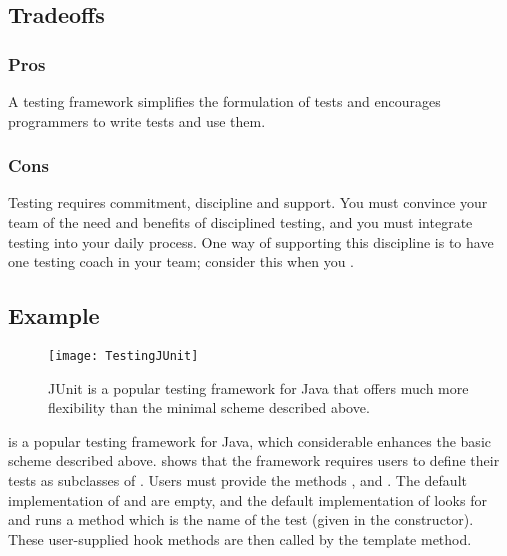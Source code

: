 \documentclass[a4paper,10pt,twoside]{book}
\begin{document}
\subsection*{Tradeoffs}

\subsubsection*{Pros}

\begin{bulletlist}
\item A testing framework simplifies the formulation of tests and encourages programmers to write tests and use them.
\end{bulletlist}

\subsubsection*{Cons}

\begin{bulletlist}
\item Testing requires commitment, discipline and support. You must convince your team of the need and benefits of disciplined testing, and you must integrate testing into your daily process. One way of supporting this discipline is to have one testing coach in your team; consider this when you .
\end{bulletlist}

\subsection*{Example}

\begin{figure}[tb]
\begin{center}
\texttt{[image: TestingJUnit]}
\caption{JUnit is a popular testing framework for Java that offers much more flexibility than the minimal scheme described above.}
\end{center}
\end{figure}

 is a popular testing framework for Java, which considerable enhances the basic scheme described above.  shows that the framework requires users to define their tests as subclasses of . Users must provide the methods ,  and . The default implementation of  and  are empty, and the default implementation of  looks for and runs a method which is the name of the test (given in the constructor). These user-supplied hook methods are then called by the  template method.
\end{document}
